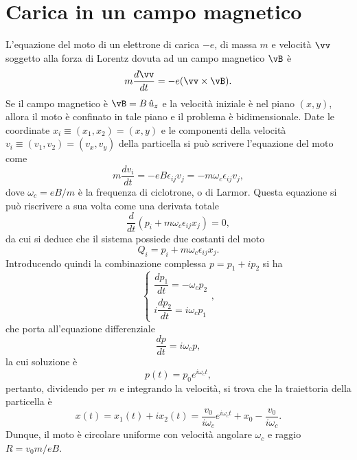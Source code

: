 \section{Carica in un campo magnetico}
L'equazione del moto di un elettrone di carica $-e$, di massa $m$ e velocità $\vv$ soggetto alla forza di Lorentz dovuta ad un campo magnetico $\vB$ è
\begin{equation}
    m\frac{d\vv}{dt} = - e(\vv \times \vB).
\end{equation}
Se il campo magnetico è $\vB = B\,\hat{u}_z$ e la velocità iniziale è nel piano $(x,y)$, allora il moto è confinato in tale piano e il problema è bidimensionale. Date le coordinate $x_i \equiv (x_1,x_2) = (x,y)$ e le componenti della velocità $v_i \equiv (v_1,v_2) = (v_x,v_y)$ della particella si può scrivere l'equazione del moto come
\begin{equation}
    m\frac{dv_i}{dt} = -eB\epsilon_{ij}v_j = -m\omega_c\epsilon_{ij}v_j,
\end{equation}
dove $\omega_c = eB/m$ è la frequenza di ciclotrone, o di Larmor. Questa equazione si può riscrivere a sua volta come una derivata totale
\begin{equation}
    \frac{d}{dt}(p_i + m\omega_c\epsilon_{ij}x_j) = 0,
\end{equation}
da cui si deduce che il sistema possiede due costanti del moto 
\begin{equation}
    Q_i = p_i + m\omega_c\epsilon_{ij}x_j.
\end{equation}
Introducendo quindi la combinazione complessa $p = p_1 + ip_2$ si ha 
\begin{equation}
    \begin{cases}
        \dfrac{dp_1}{dt} = -\omega_cp_2 \\[2ex]
        i\dfrac{dp_2}{dt} = i\omega_cp_1
    \end{cases},
\end{equation}
che porta all'equazione differenziale 
\begin{equation}
\label{eq: equazione del moto di un carica in un campo B}
    \frac{dp}{dt} = i\omega_cp,
\end{equation}
la cui soluzione è
\begin{equation}
    p(t) = p_0e^{i\omega_c t},
\end{equation}
pertanto, dividendo per $m$ e integrando la velocità, si trova che la traiettoria della particella è 
\begin{equation}
    x(t) = x_1(t) + ix_2(t) = \frac{v_0}{i\omega_c}e^{i\omega_c t} + x_0 -   \frac{v_0}{i\omega_c}.
\end{equation}
Dunque, il moto è circolare uniforme con velocità angolare $\omega_c$ e raggio $R = v_0m/eB$.

